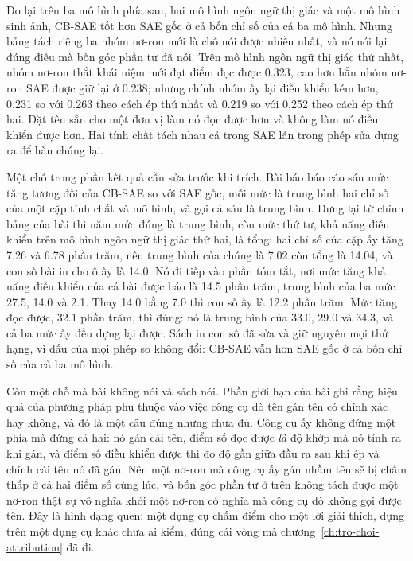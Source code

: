 %
Đo lại trên ba mô hình phía sau, hai mô hình ngôn ngữ thị giác và một mô hình
sinh ảnh, CB-SAE tốt hơn SAE gốc ở cả bốn chỉ số của cả ba mô hình. Nhưng bảng
tách riêng ba nhóm nơ-ron mới là chỗ nói được nhiều nhất, và nó nói lại đúng
điều mà bốn góc phần tư đã nói. Trên mô hình ngôn ngữ thị giác thứ nhất, nhóm
nơ-ron thắt khái niệm mới đạt điểm đọc được 0.323, cao hơn hẳn nhóm nơ-ron SAE
được giữ lại ở 0.238; nhưng chính nhóm ấy lại điều khiển kém hơn, 0.231 so với
0.263 theo cách ép thứ nhất và 0.219 so với 0.252 theo cách ép thứ hai. Đặt tên
sẵn cho một đơn vị làm nó đọc được hơn và không làm nó điều khiển được hơn. Hai
tính chất tách nhau cả trong SAE lẫn trong phép sửa dựng ra để hàn chúng lại.

%
Một chỗ trong phần kết quả cần sửa trước khi trích. Bài báo báo cáo sáu mức tăng
tương đối của CB-SAE so với SAE gốc, mỗi mức là trung bình hai chỉ số của một
cặp tính chất và mô hình, và gọi cả sáu là trung bình. Dựng lại từ chính bảng
của bài thì năm mức đúng là trung bình, còn mức thứ tư, khả năng điều khiển trên
mô hình ngôn ngữ thị giác thứ hai, là tổng: hai chỉ số của cặp ấy tăng 7.26 và
6.78 phần trăm, nên trung bình của chúng là 7.02 còn tổng là 14.04, và con số
bài in cho ô ấy là 14.0. Nó đi tiếp vào phần tóm tắt, nơi mức tăng khả năng điều
khiển của cả bài được báo là 14.5 phần trăm, trung bình của ba mức 27.5, 14.0 và
2.1. Thay 14.0 bằng 7.0 thì con số ấy là 12.2 phần trăm. Mức tăng đọc được, 32.1
phần trăm, thì
đúng: nó là trung bình của 33.0, 29.0 và 34.3, và cả ba mức ấy đều dựng lại
được. Sách in con số đã sửa và giữ nguyên mọi thứ hạng, vì dấu của mọi phép so
không đổi: CB-SAE vẫn hơn SAE gốc ở cả bốn chỉ số của cả ba mô hình.

%
Còn một chỗ mà bài không nói và sách nói. Phần giới hạn của bài ghi rằng hiệu
quả của phương pháp phụ thuộc vào việc công cụ dò tên gán tên có chính xác hay
không, và đó là một câu đúng nhưng chưa đủ. Công cụ ấy không đứng một phía mà
đứng cả hai: nó gán cái tên, điểm số đọc được \emph{là} độ khớp mà nó tính ra
khi gán, và điểm số điều khiển được thì đo độ gần giữa đầu ra sau khi ép và
chính cái tên nó đã gán. Nên một nơ-ron mà công cụ ấy gán nhầm tên sẽ bị chấm
thấp ở cả hai điểm số cùng lúc, và bốn góc phần tư ở trên không tách được một
nơ-ron thật sự vô nghĩa khỏi một nơ-ron có nghĩa mà công cụ dò không gọi được
tên. Đây là hình dạng quen: một dụng cụ chấm điểm cho một lời giải thích, dựng
trên một dụng cụ khác chưa ai kiểm, đúng cái vòng mà
chương~\ref{ch:tro-choi-attribution} đã đi.

